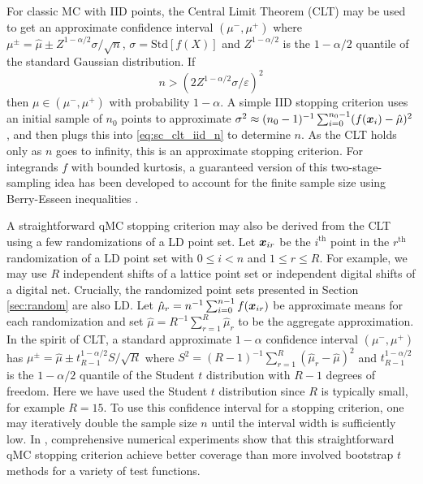 \documentclass{svproc}
\begin{document}
For classic MC with IID points, the Central Limit Theorem (CLT) may be used to get an approximate confidence interval $(\mu^-,\mu^+)$ where $\mu^\pm = \hat{\mu} \pm Z^{1-\alpha/2} \sigma/\sqrt{n}$, $\sigma = \mathrm{Std}[f(X)]$ and $Z^{1-\alpha/2}$ is the $1-\alpha/2$ quantile of the standard Gaussian distribution. If 
\begin{equation}
    n > (2 Z^{1-\alpha/2} \sigma/\varepsilon)^2
    \label{eq:sc_clt_iid_n}
\end{equation} then $\mu \in (\mu^-,\mu^+)$ with probability $1-\alpha$. A simple IID stopping criterion uses an initial sample of $n_0$ points to approximate $\sigma^2 \approx (n_0-1)^{-1} \sum_{i=0}^{n_0-1}(f({\boldsymbol{x}}_i)-\hat{\mu})^2$, and then plugs this into \eqref{eq:sc_clt_iid_n} to determine $n$. As the CLT holds only as $n$ goes to infinity, this is an approximate stopping criterion. For integrands $f$ with bounded kurtosis, a guaranteed version of this two-stage-sampling idea has been developed to account for the finite sample size using Berry-Esseen inequalities \cite{JiaHic16a}. 

A straightforward qMC stopping criterion may also be derived from the CLT using a few randomizations of a LD point set. Let ${\boldsymbol{x}}_{ir}$ be the $i^\mathrm{th}$ point in the $r^\mathrm{th}$ randomization of a LD point set with $0 \leq i < n$ and $1 \leq r \leq R$. For example, we may use $R$ independent shifts of a lattice point set or independent digital shifts of a digital net. Crucially, the randomized point sets presented in Section \ref{sec:random} are also LD. Let $\hat{\mu}_r = n^{-1} \sum_{i=0}^{n-1} f({\boldsymbol{x}}_{ir})$ be approximate means for each randomization and set $\hat{\mu} = R^{-1} \sum_{r=1}^R \hat{\mu}_r$ to be the aggregate approximation. In the spirit of CLT, a standard approximate $1-\alpha$ confidence interval $(\mu^-,\mu^+)$ has $\mu^\pm = \hat{\mu} \pm t_{R-1}^{1-\alpha/2} S/\sqrt{R}$ where $S^2 = (R-1)^{-1} \sum_{r=1}^R (\hat{\mu}_r - \hat{\mu})^2$ and $t_{R-1}^{1-\alpha/2}$ is the $1-\alpha/2$ quantile of the Student $t$ distribution with $R-1$ degrees of freedom. Here we have used the Student $t$ distribution since $R$ is typically small, for example $R=15$. To use this confidence interval for a stopping criterion, one may iteratively double the sample size $n$ until the interval width is sufficiently low. In \cite{l2023confidence}, comprehensive numerical experiments show that this straightforward qMC stopping criterion achieve better coverage than more involved bootstrap $t$ methods for a variety of test functions. 
\end{document}
